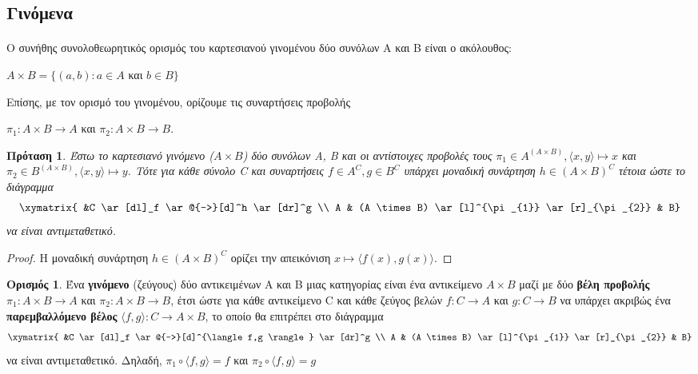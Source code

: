 \documentclass [a4paper,11pt] {book}
\newtheorem{proposition}[theorem]{Πρόταση}
\theoremstyle{definition}
\theoremstyle{definition}
\newtheorem{definition}[theorem]{Ορισμός}
\begin{document}
\subsection{Γινόμενα}
\paragraph{}
Ο συνήθης συνολοθεωρητικός ορισμός του καρτεσιανού γινομένου δύο συνόλων Α και Β είναι ο ακόλουθος:
\begin{center}
$A \times B=\{(a,b) : a \in A $ και $ b \in B\}$
\end{center}
Επίσης, με τον ορισμό του γινομένου, ορίζουμε τις συναρτήσεις προβολής
\begin{center}
$\pi_{1}: A \times B \to A$ και $\pi_{2}: A \times B \to B$.
\end{center}
\begin{proposition}\label{cartesianProduct}
Έστω το καρτεσιανό γινόμενο ($A\times B$) δύο συνόλων Α, Β και οι αντίστοιχες προβολές τους $\pi_{1}\in A^{(A\times B)}, \langle x,y\rangle \longmapsto x $ και $\pi_{2}\in B^{(A\times B)}, \langle x,y\rangle\longmapsto y $. Τότε για κάθε σύνολο C και συναρτήσεις $f\in A^{C},g\in B^{C}$ υπάρχει μοναδική συνάρτηση $h\in (A\times B)^{C}$ τέτοια ώστε το διάγραμμα
\begin{displaymath}
\xymatrix{
&C \ar[dl]_f \ar@{-->}[d]^h \ar[dr]^g \\
A & (A \times B) \ar[l]^{\pi_{1}} \ar[r]_{\pi_{2}} & B}
\end{displaymath}
να είναι αντιμεταθετικό.
\end{proposition}
\begin{proof}
Η μοναδική συνάρτηση $h \in (A\times B)^{C}$ ορίζει την απεικόνιση $x\longmapsto \langle f(x), g(x) \rangle$.
\end{proof}
\begin{definition}\label{binaryProduct}
Ένα \textbf{γινόμενο} (ζεύγους) δύο αντικειμένων Α και Β μιας κατηγορίας είναι ένα αντικείμενο $A \times B$ μαζί με δύο \textbf{βέλη προβολής} $\pi_{1}: A \times B \to A$ και $\pi_{2}: A \times B \to B$, έτσι ώστε για κάθε αντικείμενο C και κάθε ζεύγος βελών $f:C\to A$ και $g:C\to B$ να υπάρχει ακριβώς ένα \textbf{παρεμβαλλόμενο βέλος} $\langle f,g \rangle:C \to A \times B$, το οποίο θα επιτρέπει στο διάγραμμα
\begin{displaymath}
\xymatrix{
&C \ar[dl]_f \ar@{-->}[d]^{\langle f,g \rangle} \ar[dr]^g \\
A & (A \times B) \ar[l]^{\pi_{1}} \ar[r]_{\pi_{2}} & B}
\end{displaymath}
να είναι αντιμεταθετικό. Δηλαδή, $\pi_{1}\circ\langle f,g \rangle=f$ και $\pi_{2}\circ\langle f,g \rangle=g$
\end{definition}
\end{document}
